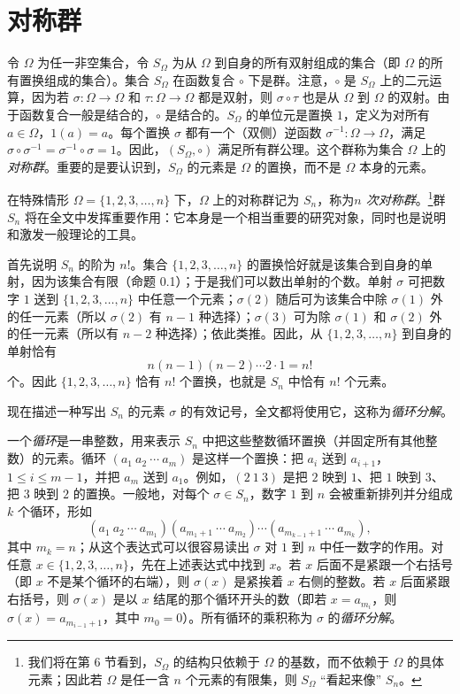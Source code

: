 \section{对称群}

令 $\Omega$ 为任一非空集合，令 $S_\Omega$ 为从 $\Omega$ 到自身的所有双射组成的集合（即 $\Omega$ 的所有置换组成的集合）。集合 $S_\Omega$ 在函数复合 $\circ$ 下是群。注意，$\circ$ 是 $S_\Omega$ 上的二元运算，因为若 $\sigma:\Omega\to\Omega$ 和 $\tau:\Omega\to\Omega$ 都是双射，则 $\sigma\circ\tau$ 也是从 $\Omega$ 到 $\Omega$ 的双射。由于函数复合一般是结合的，$\circ$ 是结合的。$S_\Omega$ 的单位元是置换 $1$，定义为对所有 $a\in\Omega$，$1(a)=a$。每个置换 $\sigma$ 都有一个（双侧）逆函数 $\sigma^{-1}:\Omega\to\Omega$，满足 $\sigma\circ\sigma^{-1}=\sigma^{-1}\circ\sigma=1$。因此，$(S_\Omega,\circ)$ 满足所有群公理。这个群称为集合 $\Omega$ 上的\emph{对称群}。重要的是要认识到，$S_\Omega$ 的元素是 $\Omega$ 的置换，而不是 $\Omega$ 本身的元素。

在特殊情形 $\Omega=\{1,2,3,\ldots,n\}$ 下，$\Omega$ 上的对称群记为 $S_n$，称为\emph{$n$ 次对称群}。\footnote{我们将在第 6 节看到，$S_\Omega$ 的结构只依赖于 $\Omega$ 的基数，而不依赖于 $\Omega$ 的具体元素；因此若 $\Omega$ 是任一含 $n$ 个元素的有限集，则 $S_\Omega$ “看起来像” $S_n$。}群 $S_n$ 将在全文中发挥重要作用：它本身是一个相当重要的研究对象，同时也是说明和激发一般理论的工具。

首先说明 $S_n$ 的阶为 $n!$。集合 $\{1,2,3,\ldots,n\}$ 的置换恰好就是该集合到自身的单射，因为该集合有限（命题 0.1）；于是我们可以数出单射的个数。单射 $\sigma$ 可把数字 $1$ 送到 $\{1,2,3,\ldots,n\}$ 中任意一个元素；$\sigma(2)$ 随后可为该集合中除 $\sigma(1)$ 外的任一元素（所以 $\sigma(2)$ 有 $n-1$ 种选择）；$\sigma(3)$ 可为除 $\sigma(1)$ 和 $\sigma(2)$ 外的任一元素（所以有 $n-2$ 种选择）；依此类推。因此，从 $\{1,2,3,\ldots,n\}$ 到自身的单射恰有
\[
  n(n-1)(n-2)\cdots 2\cdot1=n!
\]
个。因此 $\{1,2,3,\ldots,n\}$ 恰有 $n!$ 个置换，也就是 $S_n$ 中恰有 $n!$ 个元素。

现在描述一种写出 $S_n$ 的元素 $\sigma$ 的有效记号，全文都将使用它，这称为\emph{循环分解}。

一个\emph{循环}是一串整数，用来表示 $S_n$ 中把这些整数循环置换（并固定所有其他整数）的元素。循环 $(a_1\ a_2\ \cdots\ a_m)$ 是这样一个置换：把 $a_i$ 送到 $a_{i+1}$，$1\leq i\leq m-1$，并把 $a_m$ 送到 $a_1$。例如，$(2\ 1\ 3)$ 是把 $2$ 映到 $1$、把 $1$ 映到 $3$、把 $3$ 映到 $2$ 的置换。一般地，对每个 $\sigma\in S_n$，数字 $1$ 到 $n$ 会被重新排列并分组成 $k$ 个循环，形如
\[
  (a_1\ a_2\ \cdots\ a_{m_1})
  (a_{m_1+1}\ \cdots\ a_{m_2})\cdots
  (a_{m_{k-1}+1}\ \cdots\ a_{m_k}),
\]
其中 $m_k=n$；从这个表达式可以很容易读出 $\sigma$ 对 $1$ 到 $n$ 中任一数字的作用。对任意 $x\in\{1,2,3,\ldots,n\}$，先在上述表达式中找到 $x$。若 $x$ 后面不是紧跟一个右括号（即 $x$ 不是某个循环的右端），则 $\sigma(x)$ 是紧挨着 $x$ 右侧的整数。若 $x$ 后面紧跟右括号，则 $\sigma(x)$ 是以 $x$ 结尾的那个循环开头的数（即若 $x=a_{m_i}$，则 $\sigma(x)=a_{m_{i-1}+1}$，其中 $m_0=0$）。所有循环的乘积称为 $\sigma$ 的\emph{循环分解}。

